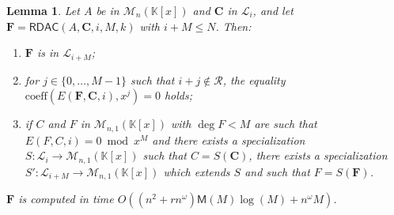 \documentclass[]{sig-alternate}
\def\RDAC{\mathsf{RDAC}}
\def\K {\ensuremath{\mathbb{K}}}
\def\M {\ensuremath{\mathsf{M}}}
\newtheorem{Lemma}{Lemma}
\begin{document}
\begin{Lemma}\label{lemma:DAC}
Let $A$ be in $\mathscr{M}_{n}(\K[x])$ and $\mathbf{C}$ in $\mathscr{L}_i$, and let
  $\mathbf{F}=\RDAC(A,\mathbf{C},i,M,k)$ with $i+M\le N$. Then:
  \begin{enumerate}
  \item\label{ptE1} $\mathbf{F}$ is in $\mathscr{L}_{i+M}$;
  \item\label{ptE2} for $j\in \{0,\dots,M-1\}$ such that $i+j\not\in\mathcal{R}$, the equality $\mathrm{coeff}(E(\mathbf{F},\mathbf{C},i), x^j)=0$ holds;
  \item\label{ptE3} if $C$ and $F$ in $\mathscr{M}_{n,1}(\K[x])$ with $\deg F<M$ are such that $E(F,C,i)=0\bmod x^M$ and there exists a specialization $S:\mathscr{L}_{i} \to
      \mathscr{M}_{n,1}(\K[x])$ such that $C=S(\mathbf{C})$, 
      there exists a specialization $S':\mathscr{L}_{i+M} \to
      \mathscr{M}_{n,1}(\K[x])$ which extends $S$ and such that
      $F=S(\mathbf{F})$.
  \end{enumerate}
$\mathbf{F}$ is computed in time  $O((n^2+rn^\omega)
\M(M)\log(M)+n^\omega M)$.
\end{Lemma}
\end{document}
